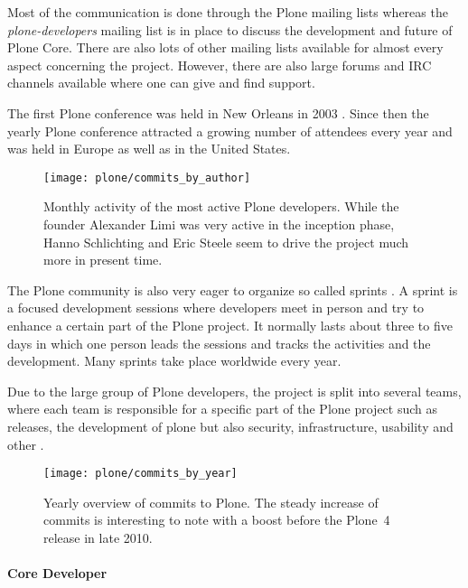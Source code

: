 Most of the communication is done through the Plone mailing lists whereas the
\emph{plone-developers} mailing list is in place to discuss the development and
future of Plone Core. There are also lots of other mailing lists available for
almost every aspect concerning the project. However, there are also large
forums and \ac{IRC} channels available where one can give and find support.

The first Plone conference was held in New Orleans in 2003
\cite{PloneConferences}. Since then the yearly Plone conference attracted a
growing number of attendees every year and was held in Europe as well as in the
United States.

\begin{figure}[htbp]
  \centering
  \texttt{[image: plone/commits\_by\_author]}
  \caption[Commits by Most Active Authors, Plone]
  {Monthly activity of the most active Plone developers. While the founder
    Alexander Limi was very active in the inception phase, Hanno Schlichting
    and Eric Steele seem to drive the project much more in present time.}
\end{figure}

The Plone community is also very eager to organize so called sprints
\cite{PloneSprints}. A sprint is a focused development sessions where
developers meet in person and try to enhance a certain part of the Plone
project. It normally lasts about three to five days in which one person leads
the sessions and tracks the activities and the development. Many sprints take
place worldwide every year.

Due to the large group of Plone developers, the project is split into several
teams, where each team is responsible for a specific part of the Plone project
such as releases, the development of plone but also security, infrastructure,
usability and other
\cite{PloneFounders,PloneReleaseManagers,PloneFrameworkTeam,PloneContribute}.

\begin{figure}[htbp]
  \centering
  \texttt{[image: plone/commits\_by\_year]}
  \caption[Commits by Year, Plone]
  {Yearly overview of commits to Plone. The steady increase of commits is
    interesting to note with a boost before the Plone~4 release in late 2010.}
\end{figure}

\paragraph{Core Developer}

